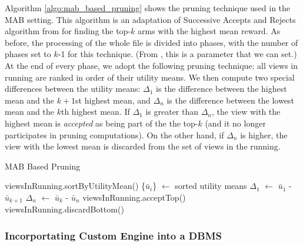 Algorithm \ref{algo:mab_based_pruning} shows the pruning technique used in the
MAB setting.
This algorithm is an adaptation of Successive Accepts and Rejects
algorithm from \cite{BubeckWV13} for finding the top-$k$ arms with the highest
mean reward.
As before, the processing of the whole file is divided into phases, with the
number of phases set to $k$-1 for this technique.
(From \cite{BubeckWV13}, this is a parameter that we can set.)
At the end of every phase, we adopt the following pruning technique: all views
in running are ranked in order of their utility means. 
We then compute two special differences between the utility means: $\Delta_1$
is the difference between the highest mean and the $k+1$st highest mean, and
$\Delta_n$ is the difference between the lowest mean and the $k$th highest mean.
If $\Delta_1$ is greater than $\Delta_n$, the view with the highest mean is
{\it accepted} as being part of the the top-$k$ (and it no longer participates
in pruning computations).
On the other hand, if $\Delta_n$ is higher, the view with the lowest mean is discarded
from the set of views in the running.

\begin{algorithm}
\caption{MAB Based Pruning}
\label{algo:mab_based_pruning}
\begin{algorithmic}[1]
\State viewsInRunning.sortByUtilityMean()
\State \{$\bar{u}_{i}$\} $\gets$ sorted utility means
\State $\Delta_1$ $\gets$ $\bar{u}_{1}$ - $\bar{u}_{k+1}$
\State $\Delta_n$ $\gets$ $\bar{u}_{k}$ - $\bar{u}_{n}$
\State viewsInRunning.acceptTop()
\Else
\State viewsInRunning.discardBottom()
\EndIf
\end{algorithmic}
\end{algorithm}


\subsubsection{Incorportating Custom Engine into a DBMS}
\label{sec:incorporating}

